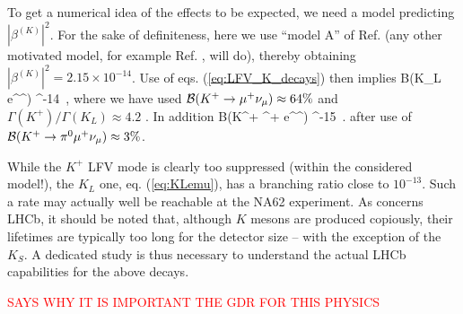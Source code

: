 To get a numerical idea of the effects to be expected, we need a model predicting $|\beta^{(K)}|^2$. For the sake of definiteness, here we use ``model A'' of Ref. \cite{Guadagnoli:2015nra} (any other motivated model, for example Ref. \cite{Boucenna:2015raa}, will do), thereby obtaining $| \beta^{(K)} |^2 = 2.15 \times 10^{-14}$. Use of eqs. (\ref{eq:LFV_K_decays}) then implies
\be
\label{eq:KLemu}
\mc B(K_L \to e^\pm \mu^\mp)  ^{-14}~,
\ee
where we have used $\mathcal B(K^+ \rightarrow \mu^+ \nu_\mu) \approx 64\%$ and $\Gamma(K^+) / \Gamma(K_L) \approx 4.2$ \cite{Agashe:2014kda}. In addition
\be
\mc B(K^+ \to \pi^+ e^\pm \mu^\mp)  ^{-15}~.
\ee
after use of $\mathcal B(K^+ \rightarrow \pi^0 \mu^+ \nu_\mu) \approx 3\%$.

While the $K^+$ LFV mode is clearly too suppressed (within the considered model!), the $K_L$ one, eq. (\ref{eq:KLemu}), has a branching ratio close to $10^{-13}$. Such a rate may actually well be reachable at the NA62 experiment. As concerns LHCb, it should be noted that, although $K$ mesons are produced copiously, their lifetimes are typically too long for the detector size -- with the exception of the $K_S$. A dedicated study is thus necessary to understand the actual LHCb capabilities for the above decays.



\textcolor{red}{SAYS WHY IT IS IMPORTANT THE GDR FOR THIS PHYSICS}





%
